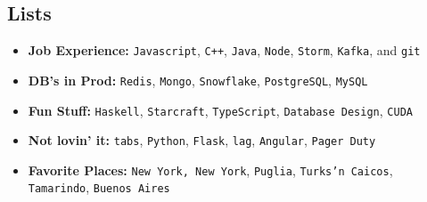 \documentclass[oneside, final]{scrartcl}
\newcommand{\lang}[1]{\colorbox{light-gray}{\texttt{#1}}}
\begin{document}
\begin{center}
\section{Lists}
\begin{itemize}
	\setlength{\itemsep}{1pt}
	\setlength{\parskip}{0pt}
	\setlength{\parsep}{0pt}
	\setlength{\leftmargin}{-5mm}
	\item \textbf{Job Experience:}  \lang{Javascript}, \lang{C++}, \lang{Java}, \lang{Node}, \lang{Storm}, \lang{Kafka}, and \lang{git} \\
	\item \textbf{DB's in Prod:} \lang{Redis}, \lang{Mongo}, \lang{Snowflake}, \lang{PostgreSQL}, \lang{MySQL} \\
	\item \textbf{Fun Stuff:}  \lang{Haskell}, \lang{Starcraft}, \lang{TypeScript}, \lang{Database Design}, \lang{CUDA} \\
	\item \textbf{Not lovin' it:} \lang{tabs}, \lang{Python}, \lang{Flask}, \lang{lag}, \lang{Angular}, \lang{Pager Duty}
	\item \textbf{Favorite Places:}
        \lang{New York, New York},
        \lang{Puglia},
        \lang{Turks'n Caicos},
        \lang{Tamarindo},
        \lang{Buenos Aires}
\end{itemize}


\end{center}
\end{document}
